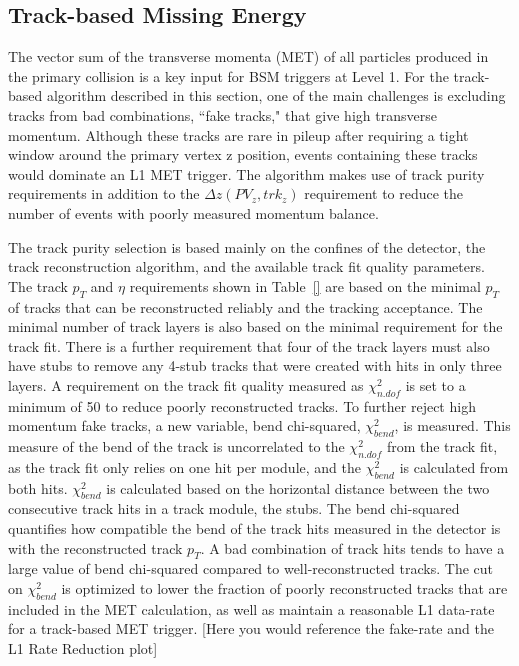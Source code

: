 \subsection{Track-based Missing Energy}
\label{sec:TkMET}

The vector sum of the transverse momenta (MET) of all particles produced in the primary collision is a key input for BSM triggers at Level 1. For the track-based algorithm described in this section, one of the main challenges is excluding tracks from bad combinations, ``fake tracks," that give high transverse momentum. Although these tracks are rare in pileup after requiring a tight window around the primary vertex z position, events containing these tracks would dominate an L1 MET trigger. The algorithm makes use of track purity requirements in addition to the $\Delta z\left(PV_{z}, trk_{z}\right)$ requirement to reduce the number of events with poorly measured momentum balance.

The track purity selection is based mainly on the confines of the detector, the track reconstruction algorithm, and the available track fit quality parameters. The track $p_{T}$ and $\eta$ requirements shown in Table~\ref{} are based on the minimal $p_{T}$ of tracks that can be reconstructed reliably and the tracking acceptance. The minimal number of track layers is also based on the minimal requirement for the track fit. There is a further requirement that four of the track layers must also have stubs to remove any 4-stub tracks that were created with hits in only three layers. A requirement on the track fit quality measured as $\chi^{2}_{n.dof}$ is set to a minimum of 50 to reduce poorly reconstructed tracks. To further reject high momentum fake tracks, a new variable, bend chi-squared, $\chi^{2}_{bend}$, is measured. This measure of the bend of the track is uncorrelated to the $\chi^{2}_{n.dof}$ from the track fit, as the track fit only relies on one hit per module, and the $\chi^{2}_{bend}$ is calculated from both hits. $\chi^{2}_{bend}$ is calculated based on the horizontal distance between the two consecutive track hits in a track module, the stubs. The bend chi-squared quantifies how compatible the bend of the track hits measured in the detector is with the reconstructed track $p_{T}$. A bad combination of track hits tends to have a large value of bend chi-squared compared to well-reconstructed tracks. The cut on $\chi^{2}_{bend}$ is optimized to lower the fraction of poorly reconstructed tracks that are included in the MET calculation, as well as maintain a reasonable L1 data-rate for a track-based MET trigger. [Here you would reference the fake-rate and the L1 Rate Reduction plot]


